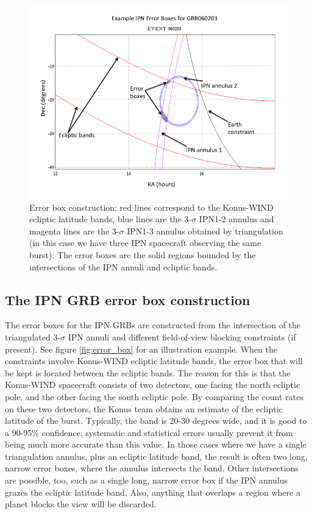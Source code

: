 \documentclass[a4paper]{jpconf}
\begin{document}
\begin{figure}[htb]
\begin{center}
\includegraphics[width=32pc]{Slide1.png}
\caption{\label{fig:error_box}Error box construction: red lines correspond to the Konus-WIND ecliptic latitude bands, blue lines are the 3-$\sigma$ IPN1-2 annulus and magenta lines are the 3-$\sigma$ IPN1-3 annulus obtained by triangulation (in this case we have three IPN spacecraft observing the same burst). The error boxes are the solid regions bounded by the intersections of the IPN annuli and ecliptic bands. }
\end{center}
\label{errorbox}
\end{figure}

\subsection{The IPN GRB error box construction}

The error boxes for the IPN GRBs are constructed from the intersection of the triangulated 3-$\sigma$ IPN annuli and different field-of-view blocking constraints (if present). See figure \ref{fig:error_box} for an illustration example. When the constraints involve Konus-WIND ecliptic latitude bands, the error box that will be kept is located between the ecliptic bands. The reason for this is that the Konus-WIND spacecraft consists of two detectors, one facing the north ecliptic pole, and the other facing the south ecliptic pole. By comparing the count rates on these two detectors, the Konus team obtains an estimate of the ecliptic latitude of the burst. Typically, the band is 20-30 degrees wide, and it is good to a 90-95\% confidence; systematic and statistical errors usually prevent it from being much more accurate than this value. In those cases where we have a single triangulation annulus, plus an ecliptic latitude band, the result is often two long, narrow error boxes, where the annulus intersects the band. Other intersections are possible, too, such as a single long, narrow error box if the IPN annulus grazes the ecliptic latitude band. Also, anything that overlaps a region where a planet blocks the view will be discarded.
\end{document}

